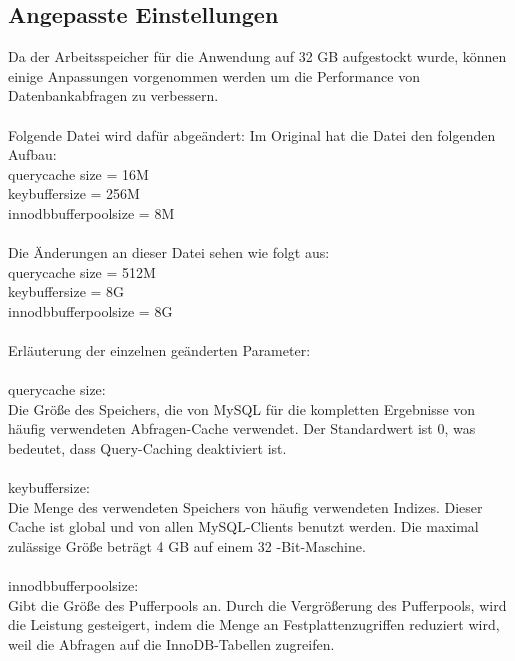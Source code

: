 \subsection{Angepasste Einstellungen}
Da der Arbeitsspeicher für die Anwendung auf 32 GB aufgestockt wurde, können einige Anpassungen vorgenommen werden um die Performance von Datenbankabfragen zu verbessern.
\\\\
Folgende Datei wird dafür abgeändert:
Im Original hat die Datei den folgenden Aufbau:
\\
query\underline \space cache \underline \space size = 16M
\\
key\underline \space buffer\underline \space size = 256M
\\
innodb\underline \space buffer\underline \space pool\underline \space size = 8M
\\\\
Die Änderungen an dieser Datei sehen wie folgt aus:
\\
query\underline \space cache \underline \space size = 512M
\\
key\underline \space buffer\underline \space size = 8G
\\
innodb\underline \space buffer\underline \space pool\underline \space size = 8G
\\\\
Erläuterung der einzelnen geänderten Parameter:
\\\\
query\underline \space cache \underline \space size:
\\
Die Größe des Speichers, die von MySQL für die kompletten Ergebnisse von häufig verwendeten Abfragen-Cache verwendet. Der Standardwert ist 0, was bedeutet, dass Query-Caching deaktiviert ist.
\\\\
key\underline \space buffer\underline \space size:
\\
Die Menge des verwendeten Speichers von häufig verwendeten Indizes. Dieser Cache ist global und von allen MySQL-Clients benutzt werden. Die maximal zulässige Größe beträgt 4 GB auf einem 32 -Bit-Maschine.
\\\\
innodb\underline \space buffer\underline \space pool\underline \space size:
\\
Gibt die Größe des Pufferpools an. Durch die Vergrößerung des Pufferpools, wird die Leistung gesteigert, indem die Menge an Festplattenzugriffen reduziert wird, weil die Abfragen auf die InnoDB-Tabellen zugreifen.
